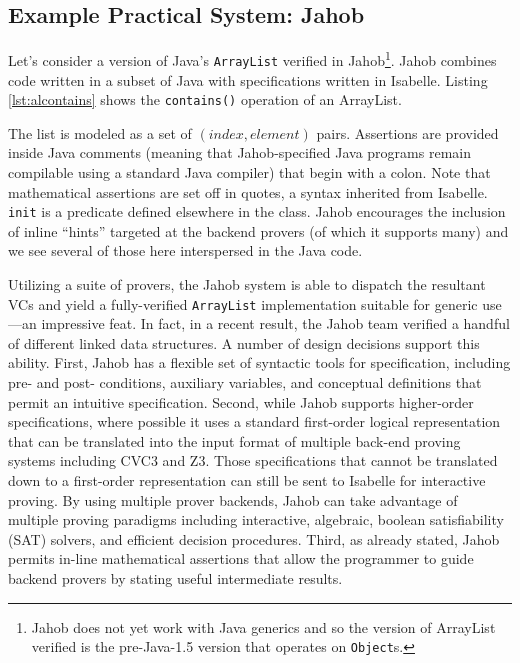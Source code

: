 \subsection{Example Practical System: Jahob\label{sec:exPractical}}
Let's consider a version of Java's \texttt{ArrayList} verified in Jahob\footnote{Jahob does not yet work with Java generics and so the version of ArrayList verified is the pre-Java-1.5 version that operates on \texttt{Object}s.}.  Jahob combines code written in a subset of Java with specifications written in Isabelle.  Listing \ref{lst:alcontains} shows the \texttt{contains()} operation of an ArrayList.



The list is modeled as a set of $(index, element)$ pairs.  Assertions are provided inside Java comments (meaning that Jahob-specified Java programs remain compilable using a standard Java compiler) that begin with a colon.  Note that mathematical assertions are set off in quotes, a syntax inherited from Isabelle.  \texttt{init} is a predicate defined elsewhere in the class.  Jahob encourages the inclusion of inline ``hints'' targeted at the backend provers\cite{zeeIntegratedProofLanguage} (of which it supports many) and we see several of those here interspersed in the Java code.

Utilizing a suite of provers, the Jahob system is able to dispatch the resultant VCs and yield a fully-verified \texttt{ArrayList} implementation suitable for generic use---an impressive feat.  In fact, in a recent result, the Jahob team verified a handful of different linked data structures\cite{zee:annotations}.  A number of design decisions support this ability.  First, Jahob has a flexible set of syntactic tools for specification, including pre- and post- conditions, auxiliary variables\cite{kingVerifier}, and conceptual definitions that permit an intuitive specification.  Second, while Jahob supports higher-order specifications, where possible it uses a standard first-order logical representation that can be translated into the input format of multiple back-end proving systems including CVC3\cite{barretCVC3} and Z3\cite{deMouraZ3}.  Those specifications that cannot be translated down to a first-order representation can still be sent to Isabelle for interactive proving.  By using multiple prover backends, Jahob can take advantage of multiple proving paradigms including interactive, algebraic, boolean satisfiability (SAT) solvers, and efficient decision procedures.  Third, as already stated, Jahob permits in-line mathematical assertions that allow the programmer to guide backend provers by stating useful intermediate results.

